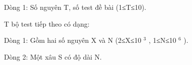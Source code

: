 Dòng 1: Số nguyên T, số test đề bài (1≤T≤10).  

   T bộ test tiếp theo có dạng:  

   Dòng 1: Gồm hai số nguyên X và N (2≤X≤10   $^    3   $   , 1≤N≤10   $^    6   $   ).  

   Dòng 2: Một xâu S có độ dài N.  

\